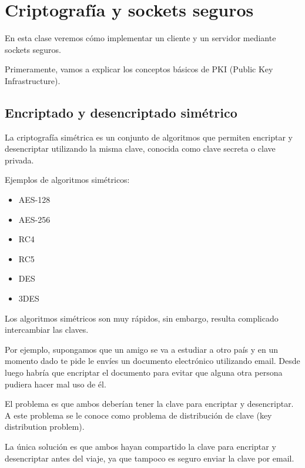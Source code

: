 \chapter{Criptografía y sockets seguros}

En esta clase veremos cómo implementar un cliente y un servidor mediante sockets seguros.

Primeramente, vamos a explicar los conceptos básicos de PKI (Public Key Infrastructure).

\section{Encriptado y desencriptado simétrico}

La criptografía simétrica es un conjunto de algoritmos que permiten encriptar y desencriptar utilizando la misma clave, conocida como clave secreta o clave privada.

Ejemplos de algoritmos simétricos:

\begin{itemize}

\item AES-128

\item AES-256

\item RC4

\item RC5

\item DES

\item 3DES

\end{itemize}

Los algoritmos simétricos son muy rápidos, sin embargo, resulta complicado intercambiar las claves.

Por ejemplo, supongamos que un amigo se va a estudiar a otro país y en un momento dado te pide le envíes un documento electrónico utilizando email. Desde luego habría que encriptar el documento para evitar que alguna otra persona pudiera hacer mal uso de él.

El problema es que ambos deberían tener la clave para encriptar y desencriptar. A este problema se le conoce como problema de distribución de clave (key distribution problem).

La única solución es que ambos hayan compartido la clave para encriptar y desencriptar antes del viaje, ya que tampoco es seguro enviar la clave por email.

